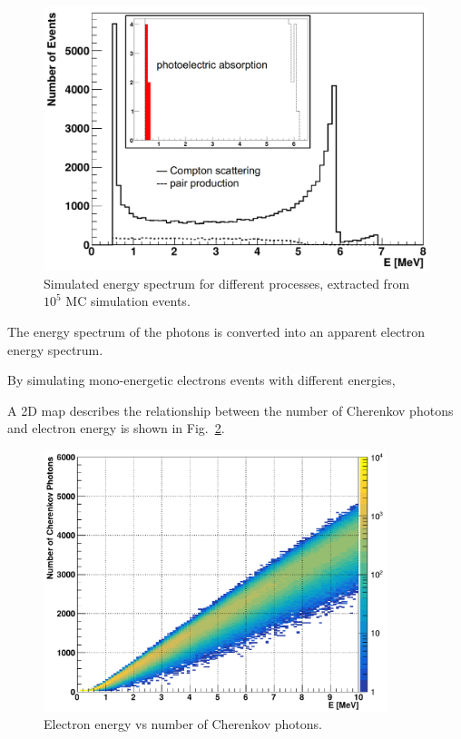 \begin{figure}[htbp]
	\centering
	\includegraphics[width=12cm]{N16_MCenergySpectrum.png}
	\caption{Simulated energy spectrum for different processes, extracted from $10^5$ MC simulation events.}
	\label{N16nhitsSimu}
\end{figure}


The energy spectrum of the photons is converted into an apparent electron energy spectrum\cite{waterunidoc}.

By simulating mono-energetic electrons events with different energies,

A 2D map describes the relationship between the number of Cherenkov photons and electron energy is shown in Fig.~\ref{N16energyMap}.  

\begin{figure}[htbp]
	\centering
	\includegraphics[width=10cm]{2dmap_EvsNphoton.png}
	\caption{Electron energy vs number of Cherenkov photons.}
	\label{N16energyMap}
\end{figure}


